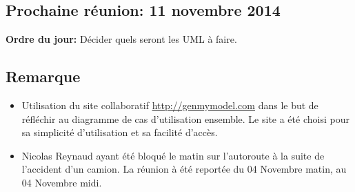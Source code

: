 \documentclass{article}
\begin{document}
\subsection*{Prochaine réunion: 11 novembre 2014}
	\textbf{Ordre du jour:} Décider quels seront les UML à faire.
	
\subsection*{Remarque}
\begin{itemize}
	\item Utilisation du site collaboratif \url{http://genmymodel.com} dans le but de réfléchir au diagramme de cas d'utilisation ensemble. Le site a été choisi pour sa simplicité d'utilisation et sa facilité d'accès.
	\item Nicolas Reynaud ayant été bloqué le matin sur l'autoroute à la suite de l'accident d'un camion. La réunion à été reportée du 04 Novembre matin, au 04 Novembre midi.
\end{itemize}
\end{document}
